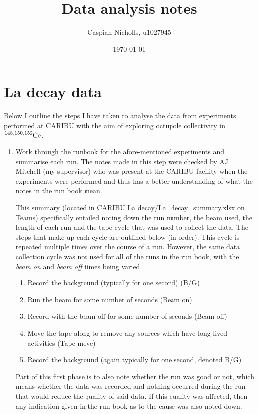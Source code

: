 \documentclass{article}
\begin{document}
\title{Data analysis notes}
\author{Caspian Nicholls, u1027945}
\date{\today}

\maketitle

\section*{La decay data}

\medskip
\noindent
Below I outline the steps I have taken to analyse the data from experiments performed at CARIBU with the aim of exploring octupole collectivity in $\ce{^{148,150,152}Ce}$.

\begin{enumerate}
\item Work through the runbook for the afore-mentioned experiments and summarise each run.
The notes made in this step were checked by AJ Mitchell (my supervisor) who was present at the CARIBU facility when the experiments were performed and thus has a better understanding of what the notes in the run book mean.

\medskip
\noindent
This summary (located in CARIBU La decay/La\_decay\_summary.xlsx on Teams) specifically entailed noting down the run number, the beam used, the length of each run and the tape cycle that was used to collect the data.
The steps that make up each cycle are outlined below (in order).
This cycle is repeated multiple times over the course of a run.
However, the same data collection cycle was not used for all of the runs in the run book, with the \textit{beam on} and \textit{beam off} times being varied.
\begin{enumerate}
\item Record the background (typically for one second) (B/G)
\item Run the beam for some number of seconds (Beam on)
\item Record with the beam off for some number of seconds (Beam off)
\item Move the tape along to remove any sources which have long-lived activities (Tape move)
\item Record the background (again typically for one second, denoted B/G)
\end{enumerate}

\noindent
Part of this first phase is to also note whether the run was good or not, which means whether the data was recorded and nothing occurred during the run that would reduce the quality of said data.
If this quality was affected, then any indication given in the run book as to the cause was also noted down.


\end{enumerate}
\end{document}
